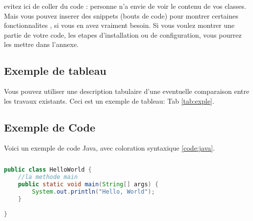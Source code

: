 \begin{spacing}{1.2}
evitez ici de coller du code : personne n'a envie de voir le contenu de vos classes.
Mais  vous  pouvez inserer des snippets (bouts de code) pour montrer certaines
fonctionnalites \cite{ELKALMEL2019}\cite{Latex}, si vous en avez vraiment besoin. Si vous voulez montrer une partie de votre code, les etapes d'installation ou de configuration, vous pourrez les mettre dans l'annexe.
\subsection{Exemple de tableau}

Vous pouvez utiliser une description tabulaire d'une eventuelle comparaison entre les travaux existants. Ceci est un exemple de tableau: Tab \ref{tab:exple}.



\subsection{Exemple de Code}
Voici un exemple de code Java, avec coloration syntaxique \ref{code:java}.

\begin{lstlisting}[rulecolor=\color{white}]
\end{lstlisting}

\begin{lstlisting}[label=code:java,caption=Helloworld Java,language=java]
	public class HelloWorld {
	//la methode main
    public static void main(String[] args) {
        System.out.println("Hello, World");
    }

}
\end{lstlisting}


\end{spacing}
